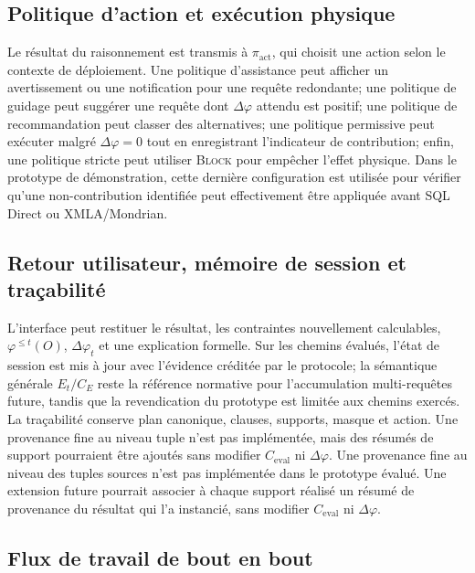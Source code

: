 \documentclass[journal]{IEEEtran}
\begin{document}


\subsection{Politique d'action et exécution physique}

Le résultat du raisonnement est transmis à $\pi_{\mathrm{act}}$, qui choisit une action selon le contexte de déploiement. Une politique d'assistance peut afficher un avertissement ou une notification pour une requête redondante; une politique de guidage peut suggérer une requête dont $\Delta\varphi$ attendu est positif; une politique de recommandation peut classer des alternatives; une politique permissive peut exécuter malgré $\Delta\varphi=0$ tout en enregistrant l'indicateur de contribution; enfin, une politique stricte peut utiliser \textsc{Block} pour empêcher l'effet physique. Dans le prototype de démonstration, cette dernière configuration est utilisée pour vérifier qu'une non-contribution identifiée peut effectivement être appliquée avant SQL Direct ou XMLA/Mondrian.

\subsection{Retour utilisateur, mémoire de session et traçabilité}

L'interface peut restituer le résultat, les contraintes nouvellement calculables, $\varphi^{\le t}(O)$, $\Delta\varphi_t$ et une explication formelle. Sur les chemins évalués, l'état de session est mis à jour avec l'évidence créditée par le protocole; la sémantique générale $E_t/C_E$ reste la référence normative pour l'accumulation multi-requêtes future, tandis que la revendication du prototype est limitée aux chemins exercés. La traçabilité conserve plan canonique, clauses, supports, masque et action. Une provenance fine au niveau tuple n'est pas implémentée, mais des résumés de support pourraient être ajoutés sans modifier $C_{\mathrm{eval}}$ ni $\Delta\varphi$.
Une provenance fine au niveau des tuples sources n'est pas implémentée dans le prototype évalué. Une extension future pourrait associer à chaque support réalisé un résumé de provenance du résultat qui l'a instancié, sans modifier $C_{\mathrm{eval}}$ ni $\Delta\varphi$.

\subsection{Flux de travail de bout en bout}
\end{document}
